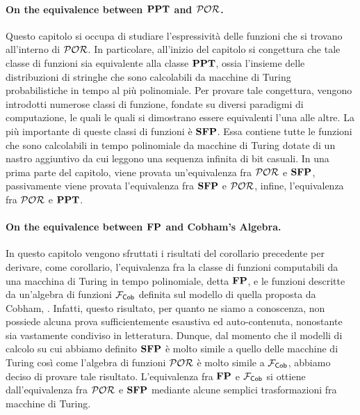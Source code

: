 \documentclass{article}
\begin{document}
\paragraph*{On the equivalence between $\mathbf{PPT}$ and $\mathcal{POR}$.} Questo capitolo si occupa
di studiare l'espressività delle funzioni che si trovano all'interno di $\mathcal{POR}$. In particolare, all'inizio del capitolo si
congettura che tale classe di funzioni sia equivalente alla classe $\mathbf{PPT}$, ossia
l'insieme delle distribuzioni di stringhe che sono calcolabili da macchine di Turing
probabilistiche in tempo al più polinomiale. Per provare tale congettura, vengono
introdotti numerose classi di funzione, fondate su diversi paradigmi di computazione,
le quali le quali si dimostrano essere equivalenti l'una alle altre.
La più importante di queste
classi di funzioni è $\mathbf{SFP}$. Essa contiene tutte le funzioni che sono calcolabili in
tempo polinomiale da macchine di Turing dotate di un nastro aggiuntivo da cui leggono
una sequenza infinita di bit casuali. In una prima parte del capitolo, viene provata
un'equivalenza fra $\mathcal{POR}$ e $\mathbf{SFP}$, passivamente viene provata l'equivalenza fra
$\mathbf{SFP}$ e $\mathcal{POR}$, infine, l'equivalenza fra $\mathcal{POR}$ e $\mathbf{PPT}$.

\paragraph*{On the equivalence between $\mathbf{FP}$ and Cobham's Algebra.} In questo capitolo
vengono sfruttati i risultati del corollario precedente per derivare, come corollario,
l'equivalenza fra la classe di funzioni computabili da una macchina di Turing in tempo
polinomiale, detta $\mathbf{FP}$, e le funzioni descritte da un'algebra di funzioni $\mathcal{F}_{\mathsf{Cob}}$
definita sul modello
di quella proposta da Cobham, \cite{Cobham1965}. Infatti, questo risultato, per quanto ne siamo a conoscenza,
non possiede alcuna prova sufficientemente esaustiva ed auto-contenuta, nonostante sia
vastamente condiviso in letteratura.
Dunque, dal momento che il modelli di calcolo su cui abbiamo definito $\mathbf{SFP}$
è molto simile a quello delle macchine di Turing così come l'algebra di
funzioni $\mathcal{POR}$ è molto simile a $\mathcal{F}_{\mathsf{Cob}}$, abbiamo deciso di provare tale risultato.
L'equivalenza fra $\mathbf{FP}$ e $\mathcal{F}_{\mathsf{Cob}}$ si ottiene dall'equivalenza fra $\mathcal{POR}$ e $\mathbf{SFP}$
mediante alcune semplici trasformazioni fra macchine di Turing.
\end{document}
